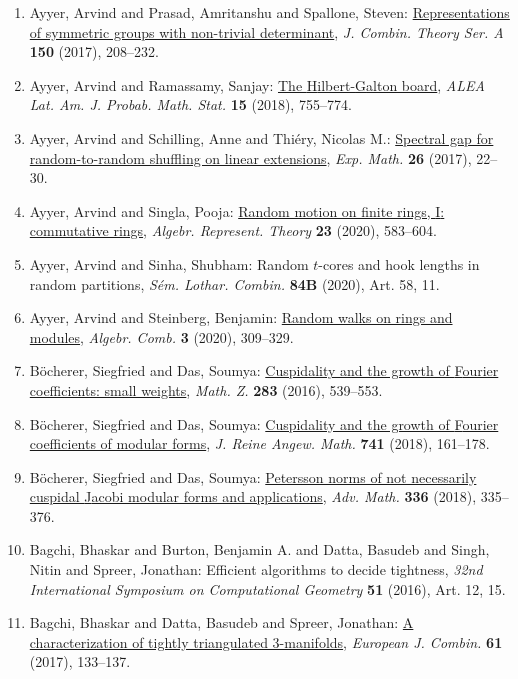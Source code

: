 \begin{enumerate}
\item Ayyer, Arvind and Prasad, Amritanshu and Spallone, Steven: \href{https://doi.org/10.1016/j.jcta.2017.03.004}{Representations of symmetric groups with non-trivial
determinant}, \emph{J. Combin. Theory Ser. A} {\bf 150} (2017), 208--232.
\item Ayyer, Arvind and Ramassamy, Sanjay: \href{https://doi.org/10.30757/alea.v15-28}{The {H}ilbert-{G}alton board}, \emph{ALEA Lat. Am. J. Probab. Math. Stat.} {\bf 15} (2018), 755--774.
\item Ayyer, Arvind and Schilling, Anne and Thi\'{e}ry, Nicolas M.: \href{https://doi.org/10.1080/10586458.2015.1107868}{Spectral gap for random-to-random shuffling on linear
extensions}, \emph{Exp. Math.} {\bf 26} (2017), 22--30.
\item Ayyer, Arvind and Singla, Pooja: \href{https://doi.org/10.1007/s10468-019-09864-w}{Random motion on finite rings, {I}: commutative rings}, \emph{Algebr. Represent. Theory} {\bf 23} (2020), 583--604.
\item Ayyer, Arvind and Sinha, Shubham: Random {$t$}-cores and hook lengths in random partitions, \emph{S\'{e}m. Lothar. Combin.} {\bf 84B} (2020), Art. 58, 11.
\item Ayyer, Arvind and Steinberg, Benjamin: \href{https://doi.org/10.5802/alco.94}{Random walks on rings and modules}, \emph{Algebr. Comb.} {\bf 3} (2020), 309--329.
\item B\"{o}cherer, Siegfried and Das, Soumya: \href{https://doi.org/10.1007/s00209-015-1609-2}{Cuspidality and the growth of {F}ourier coefficients: small
weights}, \emph{Math. Z.} {\bf 283} (2016), 539--553.
\item B\"{o}cherer, Siegfried and Das, Soumya: \href{https://doi.org/10.1515/crelle-2015-0075}{Cuspidality and the growth of {F}ourier coefficients of
modular forms}, \emph{J. Reine Angew. Math.} {\bf 741} (2018), 161--178.
\item B\"{o}cherer, Siegfried and Das, Soumya: \href{https://doi.org/10.1016/j.aim.2018.07.033}{Petersson norms of not necessarily cuspidal {J}acobi modular
forms and applications}, \emph{Adv. Math.} {\bf 336} (2018), 335--376.
\item Bagchi, Bhaskar and Burton, Benjamin A. and Datta, Basudeb and
Singh, Nitin and Spreer, Jonathan: Efficient algorithms to decide tightness, \emph{32nd {I}nternational {S}ymposium on {C}omputational
{G}eometry} {\bf 51} (2016), Art. 12, 15.
\item Bagchi, Bhaskar and Datta, Basudeb and Spreer, Jonathan: \href{https://doi.org/10.1016/j.ejc.2016.10.005}{A characterization of tightly triangulated 3-manifolds}, \emph{European J. Combin.} {\bf 61} (2017), 133--137.

\end{enumerate}
